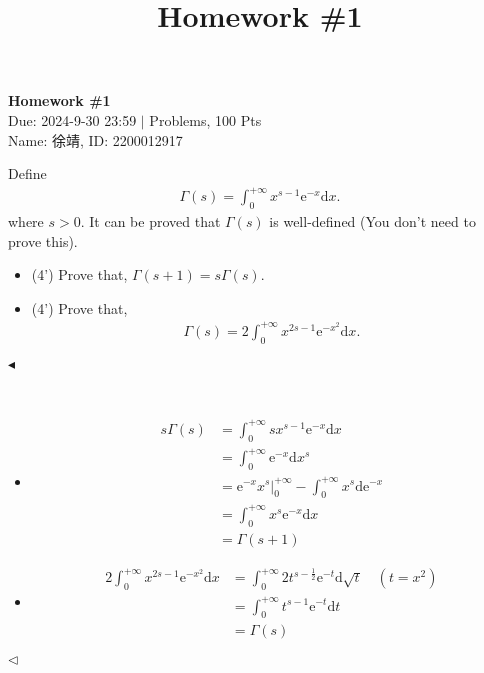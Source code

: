 \documentclass[11pt]{article}
\title{Homework \#1}
\newenvironment{problem}[2][Problem]{\begin{trivlist}
\item[\hskip \labelsep {\bfseries #1}\hskip \labelsep {\bfseries #2.}]}{\hfill$\blacktriangleleft$\end{trivlist}}
\newenvironment{answer}[1][Answer]{\begin{trivlist}
\item[\hskip \labelsep {\bfseries #1.}\hskip \labelsep]}{\hfill$\lhd$\end{trivlist}}
\begin{document}
\pagestyle{fancy}
\chead{}

\begin{center}
    {\LARGE \bf Homework \#1}\\
    {Due: 2024-9-30 23:59 \quad$|$ Problems, 100 Pts}\\
    {Name: 徐靖, ID: 2200012917}            %
\end{center}



\begin{problem}{1 (8')}
Define
\begin{align*}
    \Gamma(s) = \int_{0}^{+\infty} x^{s - 1} \mathrm{e}^{-x} \mathrm{d}x.
\end{align*}
where $s>0$. It can be proved that $\Gamma(s)$ is well-defined (You don't need to prove this).
\begin{itemize}
    \item [(1)] (4') Prove that, $\Gamma(s+1)=s\Gamma(s)$.
    \item [(2)] (4') Prove that,
    \begin{align*}
        \Gamma(s)=2\int_{0}^{+\infty}x^{2s-1}\mathrm{e}^{-x^2}\mathrm{d}x.
    \end{align*}
\end{itemize}
\end{problem}

\begin{answer} ~
\begin{itemize}
    \item [(1)] 
$$\begin{align*}
s\Gamma(s)&=\int_{0}^{+\infty}sx^{s-1}\mathrm e^{-x}\mathrm dx\\
&=\int_{0}^{+\infty}\mathrm e^{-x}\mathrm dx^s\\
&=\mathrm e^{-x}x^s\Big|_0^{+\infty}-\int_{0}^{+\infty}x^{s}\mathrm d\mathrm e^{-x}\\
&=\int_{0}^{+\infty}x^{s}\mathrm e^{-x}\mathrm dx\\
&=\Gamma(s+1)
\end{align*}$$
    \item [(2)] 
$$\begin{align*}
2\int_{0}^{+\infty}x^{2s-1}\mathrm{e}^{-x^2}\mathrm{d}x &= \int_{0}^{+\infty}2t^{s-\frac{1}{2}}\mathrm e^{-t}\mathrm d \sqrt{t} \quad (t=x^2)\\
&= \int_{0}^{+\infty}t^{s-1}\mathrm e^{-t}\mathrm dt\\
&= \Gamma (s)
\end{align*}$$
\end{itemize}
\end{answer}
\end{document}
